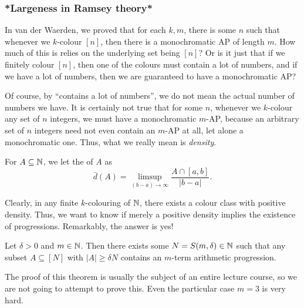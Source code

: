 \documentclass[a4paper]{article}
\begin{document}
  \subsubsection*{*Largeness in Ramsey theory*}
  In van der Waerden, we proved that for each $k, m$, there is some $n$ such that whenever we $k$-colour $[n]$, then there is a monochromatic AP of length $m$. How much of this is relies on the underlying set being $[n]$? Or is it just that if we finitely colour $[n]$, then one of the colours must contain a lot of numbers, and if we have a lot of numbers, then we are guaranteed to have a monochromatic AP?

  Of course, by ``contains a lot of numbers'', we do not mean the actual number of numbers we have. It is certainly not true that for some $n$, whenever we $k$-colour any set of $n$ integers, we must have a monochromatic $m$-AP, because an arbitrary set of $n$ integers need not even contain an $m$-AP at all, let alone a monochromatic one. Thus, what we really mean is \emph{density}.
  \begin{defi}[Density]
    For $A \subseteq \mathbb{N}$, we let the  of $A$ as
    \[
      \bar{d}(A) = \limsup_{(b - a) \to \infty} \frac{A \cap [a, b]}{|b - a|}.
    \]
  \end{defi}
  Clearly, in any finite $k$-colouring of $\mathbb{N}$, there exists a colour class with positive density. Thus, we want to know if merely a positive density implies the existence of progressions. Remarkably, the answer is yes!

  \begin{thm}
    Let $\delta > 0$ and $m \in \mathbb{N}$. Then there exists some $N = S(m, \delta) \in \mathbb{N}$ such that any subset $A \subseteq [N]$ with $|A| \geq \delta N$ contains an $m$-term arithmetic progression.
  \end{thm}
  The proof of this theorem is usually the subject of an entire lecture course, so we are not going to attempt to prove this. Even the particular case $m = 3$ is very hard.
\end{document}
